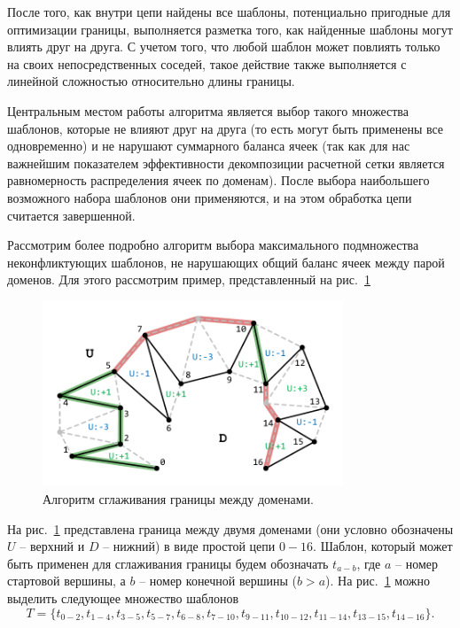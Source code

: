 После того, как внутри цепи найдены все шаблоны, потенциально пригодные для оптимизации границы, выполняется разметка того, как найденные шаблоны могут влиять друг на друга.
С учетом того, что любой шаблон может повлиять только на своих непосредственных соседей, такое действие также выполняется с линейной сложностью относительно длины границы.

Центральным местом работы алгоритма является выбор такого множества шаблонов, которые не влияют друг на друга (то есть могут быть применены все одновременно) и не нарушают суммарного баланса ячеек (так как для нас важнейшим показателем эффективности декомпозиции расчетной сетки является равномерность распределения ячеек по доменам).
После выбора наибольшего возможного набора шаблонов они применяются, и на этом обработка цепи считается завершенной.

Рассмотрим более подробно алгоритм выбора максимального подмножества неконфликтующих шаблонов, не нарушающих общий баланс ячеек между парой доменов.
Для этого рассмотрим пример, представленный на рис.~\ref{fig:text_2_smooth_smooth}

\begin{figure}[ht]
\centering
\includegraphics[width=0.8\textwidth]{fig/par_smooth.pdf}
\singlespacing
{}\caption{Алгоритм сглаживания границы между доменами.}
\label{fig:text_2_smooth_smooth}
\end{figure}

На рис.~\ref{fig:text_2_smooth_smooth} представлена граница между двумя доменами (они условно обозначены $U$ -- верхний и $D$ -- нижний) в виде простой цепи $0-16$.
Шаблон, который может быть применен для сглаживания границы будем обозначать $t_{a-b}$, где $a$ -- номер стартовой вершины, а $b$ -- номер конечной вершины ($b > a$).
На рис.~\ref{fig:text_2_smooth_smooth} можно выделить следующее множество шаблонов
\begin{equation}
T = \{ t_{0-2}, t_{1-4}, t_{3-5}, t_{5-7}, t_{6-8}, t_{7-10}, t_{9-11}, t_{10-12}, t_{11-14}, t_{13-15}, t_{14-16} \}.
\end{equation}

